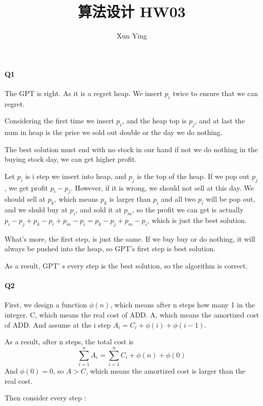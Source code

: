 \documentclass[UTF8]{ctexart}
\renewcommand{\(}{\left(}
\renewcommand{\)}{\right)}
\begin{document}
\title{算法设计 HW03}  
\author{Xun Ying}
\maketitle

\paragraph{Q1} 

The GPT is right. As it is a regret heap. We insert $p_{i}$ twice to ensure that we can regret.

Considering the first time we insert $p_{i}$, and the heap top is $p_{j}$, and at last the num in heap is the price we sold out double or the day we do nothing.

The best solution must end with no stock in our hand if not we do nothing in the buying stock day, we can get higher profit. 

Let $p_{i}$ is i step we insert into heap, and $p_{j}$ is the top of the heap.
If we pop out $p_{j}$ , we get profit $p_{i} - p_{j}$. However, if it is wrong, we should not sell at this day. We should 
sell at $p_{k}$, which means $p_{k}$ is larger than $p_{i}$ and all two $p_{i}$ will be pop out, and we shuld buy at $p_{i}$, and sold it at $p_{m}$, so the profit we can get
is actually $p_{i} - p_{j} + p_{k} - p_{i} + p_{m} - p_{i} = p_{k}- p_{j} + p_{m} - p_{i}$, which is just the best solution. 

What's more, the first step, is just the same. If we buy buy or do nothing, it will always be pushed into the heap, so GPT's first 
step is best solution. 

As a result, GPT' s every step is the best solution, so the algorithm is correct.

\paragraph{Q2}

First, we design a function $\phi(n)$, which means after n steps how many 1 in the integer.  
C, which means the real cost of ADD.  A, which means the amortized cost of ADD. 
And assume at the i step $A_{i} = C_{i} + \phi(i) + \phi(i-1)$. 

As a result, after n steps, the total cost is 
$$\sum_{i=1}^{n} A_{i} = \sum_{i=1}^{n} C_{i} +\phi(n) + \phi(0)$$
And $\phi(0)=0$, so $A > C$, which means the amortized cost is larger than the real cost.

Then consider every step :
\end{document}
